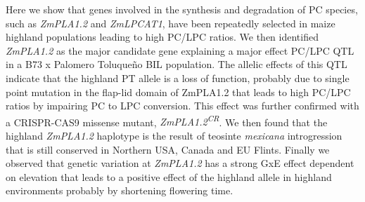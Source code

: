 \documentclass[9pt,twocolumn,twoside,lineno]{BioRxiv}
\begin{document}
Here we show that genes involved in the synthesis and degradation of PC species, such as \textit{ZmPLA1.2} and \textit{ZmLPCAT1}, have been repeatedly selected in maize highland populations leading to high PC/LPC ratios.   
We then identified \textit{ZmPLA1.2} as the major candidate gene explaining a major effect PC/LPC QTL in a B73 x Palomero Toluqueño BIL population. 
The allelic effects of this QTL indicate that the highland PT allele is a loss of function, probably due to single point mutation in the flap-lid domain of ZmPLA1.2 that leads to high PC/LPC ratios by impairing PC to LPC conversion. 
This effect was further confirmed with a CRISPR-CAS9 missense mutant, \textit{ZmPLA1.2\textsuperscript{CR}}.
We then found that the highland \textit{ZmPLA1.2} haplotype is the result of teosinte \textit{mexicana} introgression that is still conserved in Northern USA, Canada and EU Flints. 
Finally we observed that genetic variation at \textit{ZmPLA1.2} has a strong GxE effect dependent on elevation that leads to a positive effect of the highland allele in highland environments probably by shortening flowering time.
\end{document}
